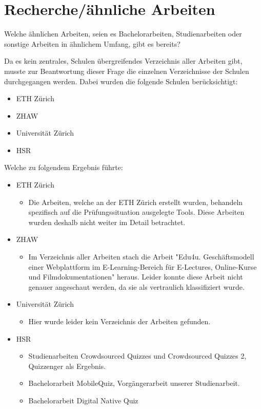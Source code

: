 \newpage

\section{Recherche/ähnliche Arbeiten}

Welche ähnlichen Arbeiten, seien es Bachelorarbeiten, Studienarbeiten oder sonstige Arbeiten in ähnlichem Umfang, gibt es bereits?

Da es kein zentrales, Schulen übergreifendes Verzeichnis aller Arbeiten gibt, musste zur Beantwortung dieser Frage die einzelnen Verzeichnisse der Schulen durchgegangen werden. Dabei wurden die folgende Schulen berücksichtigt:
\begin{itemize}
	\item ETH Zürich
	\item ZHAW
	\item Universität Zürich
	\item HSR
\end{itemize}

\bigskip

Welche zu folgendem Ergebnis führte:
\begin{itemize}
	\item ETH Zürich
	\begin{itemize}
		\item Die Arbeiten, welche an der ETH Zürich erstellt wurden, behandeln spezifisch auf die Prüfungssituation ausgelegte Tools. Diese Arbeiten wurden deshalb nicht weiter im Detail betrachtet. 
	\end{itemize}
	\item ZHAW
	\begin{itemize}
		\item Im Verzeichnis aller Arbeiten stach die Arbeit "Edu4u. Geschäftsmodell einer Webplattform im E-Learning-Bereich für E-Lectures, Online-Kurse und Filmdokumentationen" heraus. Leider konnte diese Arbeit nicht genauer angeschaut werden, da sie als vertraulich klassifiziert wurde.
	\end{itemize}
	\item Universität Zürich
	\begin{itemize}
		\item Hier wurde leider kein Verzeichnis der Arbeiten gefunden.
	\end{itemize}
	\item HSR
	\begin{itemize}
		\item Studienarbeiten Crowdsourced Quizzes und Crowdsourced Quizzes 2, Quizzenger als Ergebnis.
		\item Bachelorarbeit MobileQuiz, Vorgängerarbeit unserer Studienarbeit.
		\item Bachelorarbeit Digital Native Quiz
	\end{itemize}
\end{itemize}

